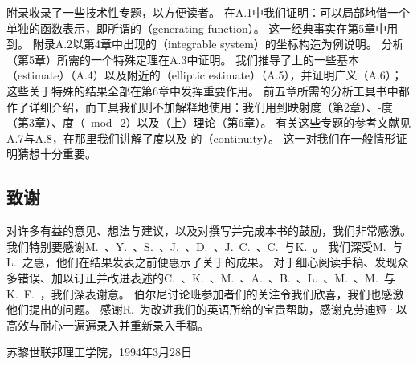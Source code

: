 附录收录了一些技术性专题，以方便读者。
在A.1中我们证明：\trSymplectic\trDiffeomorphism{}可以局部地借一个单独的函数表示，即所谓的\textbf{\trGeneratingFunction}（generating function）。
这一经典事实在第5章中用到。
附录A.2以第4章中出现的\textbf{\trIntegrableSystem}（integrable system）的\trActionAngle{}坐标构造为例说明\trGeneratingFunction。
分析\trActionFunctional{}（第5章）所需的一个特殊\trSobolev\trEmbedding{}定理在A.3中证明。
我们推导了\trSphere{}上\trCauchyRiemann\trOperator{}的一些基本\textbf{\trEstimate}（estimate）（A.4）以及\trBoundary{}附近的\trEllipticEstimate{}（elliptic estimate）（A.5），并证明广义\trCarleman{}\trSimilarityPrinciple（A.6）；这些关于特殊\trPartialDifferentialEquation{}的结果全部在第6章中发挥重要作用。
前五章所需的分析工具书中都作了详细介绍，而\trTopology{}工具我们则不加解释地使用：我们用到\trBrouwer{}映射度（第2章）、\trLeray-\trSchauder{}度（第3章）、\trSmale{}度（$\bmod\ 2$）以及（上）\trHomology{}理论（第6章）。
有关这些\trTopology{}专题的参考文献见A.7与A.8，在那里我们讲解了\trBrouwer{}度以及\trAlexander-\trSpanier\trCohomology{}的\textbf{\trContinuity}（continuity）。
这一\trContinuity{}对我们在一般情形证明\trArnold{}猜想十分重要。

\subsection*{致谢}

对许多有益的意见、想法与建议，以及对撰写并完成本书的鼓励，我们非常感激。
我们特别要感谢M.~\trChaperon、Y.~\trEliashberg、S.~\trKuksin、J.~\trMoser、D.~\trSalamon、J.~C.~\trSikorav、C.~\trViterbo{}与K.~\trWysocki。
我们深受M.~\trBialy{}与L.~\trPolterovich{}之惠，他们在结果发表之前便惠示了关于\trGeodesic{}的成果。
对于细心阅读手稿、发现众多错误、加以订正并改进表述的C.~\trAbbas、K.~\trCieliebak、M.~\trFlucher、A.~\trGoing、B.~\trGratza、L.~\trKaas、M.~\trKriener、M.~\trSchwarz{}与K.~F.~\trSiburg，我们深表谢意。
伯尔尼\trBorel{}讨论班参加者们的关注令我们欣喜，我们也感激他们提出的问题。
感谢R.~\trMcLachlan{}为改进我们的英语所给的宝贵帮助，感谢克劳迪娅·\trFlepp{}以高效与耐心一遍遍录入并重新录入手稿。

\medskip
\noindent
苏黎世联邦理工学院，1994年3月28日
